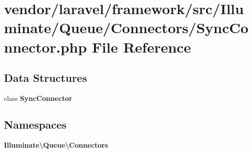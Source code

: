 \section{vendor/laravel/framework/src/\+Illuminate/\+Queue/\+Connectors/\+Sync\+Connector.php File Reference}
\label{_sync_connector_8php}
\subsection*{Data Structures}
\begin{DoxyCompactItemize}
\item 
class {\bf Sync\+Connector}
\end{DoxyCompactItemize}
\subsection*{Namespaces}
\begin{DoxyCompactItemize}
\item 
 {\bf Illuminate\textbackslash{}\+Queue\textbackslash{}\+Connectors}
\end{DoxyCompactItemize}

